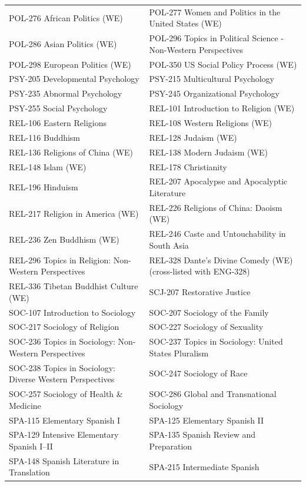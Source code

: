\documentclass[
  letterpaper,
]{scrbook}
\begin{document}
{\begin{longtable}[]{@{}
  >{\raggedright\arraybackslash}p{}
  >{\raggedright\arraybackslash}p{}@{}}
POL-276 African Politics (WE) & POL-277 Women and Politics in the United
States (WE) \\
POL-286 Asian Politics (WE) & POL-296 Topics in Political Science -
Non-Western Perspectives \\
POL-298 European Politics (WE) & POL-350 US Social Policy Process
(WE) \\
PSY-205 Developmental Psychology & PSY-215 Multicultural Psychology \\
PSY-235 Abnormal Psychology & PSY-245 Organizational Psychology \\
PSY-255 Social Psychology & REL-101 Introduction to Religion (WE) \\
REL-106 Eastern Religions & REL-108 Western Religions (WE) \\
REL-116 Buddhism & REL-128 Judaism (WE) \\
REL-136 Religions of China (WE) & REL-138 Modern Judaism (WE) \\
REL-148 Islam (WE) & REL-178 Christianity \\
REL-196 Hinduism & REL-207 Apocalypse and Apocalyptic Literature \\
REL-217 Religion in America (WE) & REL-226 Religions of China: Daoism
(WE) \\
REL-236 Zen Buddhism (WE) & REL-246 Caste and Untouchability in South
Asia \\
REL-296 Topics in Religion: Non-Western Perspectives & REL-328 Dante's
Divine Comedy (WE) (cross-listed with ENG-328) \\
REL-336 Tibetan Buddhist Culture (WE) & SCJ-207 Restorative Justice \\
SOC-107 Introduction to Sociology & SOC-207 Sociology of the Family \\
SOC-217 Sociology of Religion & SOC-227 Sociology of Sexuality \\
SOC-236 Topics in Sociology: Non-Western Perspectives & SOC-237 Topics
in Sociology: United States Pluralism \\
SOC-238 Topics in Sociology: Diverse Western Perspectives & SOC-247
Sociology of Race \\
SOC-257 Sociology of Health \& Medicine & SOC-286 Global and
Transnational Sociology \\
SPA-115 Elementary Spanish I & SPA-125 Elementary Spanish II \\
SPA-129 Intensive Elementary Spanish I--II & SPA-135 Spanish Review and
Preparation \\
SPA-148 Spanish Literature in Translation & SPA-215 Intermediate Spanish

\end{longtable}}
\end{document}
